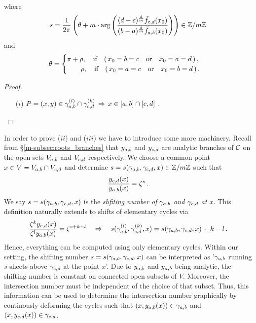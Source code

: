 \documentclass[main.tex]{subfiles}
\begin{document}
\begin{thm}
\begin{itemize}
\begin{align*}
       \end{align*}
       where  
       \begin{align}\label{eq:shift_numb}
       s = \frac{1}{2\pi} \left( \theta +  m \cdot \arg \left( \frac{(d-c)^{\frac{d}{m}} \tilde{f}_{c,d}(x_0)}{(b-a)^{\frac{d}{m}} \tilde{f}_{a,b}(x_0)} \right) \right) \in \mathbb{Z}/m\mathbb{Z}
       \end{align}
       and 
       \begin{align*}
        \theta = \begin{cases}
                              \pi+\rho, \quad \text{if} \quad (\,x_0 = b = c \quad \text{or} \quad x_0 = a = d\,)\,,\\
                              \hspace{0.7cm} \rho, \quad \text{if} \quad (\,x_0 = a = c \quad \text{or} \quad x_0 = b = d\,)\,.
                             \end{cases}
       \end{align*}
      \end{itemize}
 \end{thm}

  \begin{proof}\let\qed\relax
   \begin{itemize}
    \item[($i$)] $P = (x,y) \in \gamma_{a,b}^{(l)} \cap \gamma_{c,d}^{(k)} \,  \Rightarrow \, x \in [a,b] \cap [c,d]$\,.
   \end{itemize}
  \end{proof}
  
  In order to prove ($ii$) and ($iii$) we have to introduce some more machinery. Recall from \S \ref{m-subsec:roots_branches} that $y_{a,b}$ and $y_{c,d}$ are analytic branches of $\mathcal{C}$ on the open sets
  $V_{a,b}$ and $V_{c,d}$ respectively. \abstandl
  We choose a common point $x \in V = V_{a,b} \cap V_{c,d}$ and determine $s  = s(\gamma_{a,b},\gamma_{c,d},x) \in \mathbb{Z}/m\mathbb{Z}$  such that
  \begin{align}
	  \frac{y_{c,d}(x)}{y_{a,b}(x)} = \zeta^s \,.
  \end{align}
  We say $s  = s(\gamma_{a,b},\gamma_{c,d},x)$ is the \emph{shfiting number of $\gamma_{a,b}$ and $\gamma_{c,d}$ at $x$}.
  This definition naturally extends to shifts of elementary cycles via
\begin{align}\label{eq:shift_numb_rel}
	 \frac{\zeta^ky_{c,d}(x)}{\zeta^ly_{a,b}(x)} = \zeta^{s+k-l} \quad \Rightarrow \quad s(\gamma_{a,b}^{(l)},\gamma_{c,d}^{(k)},x) = s(\gamma_{a,b},\gamma_{c,d},x) + k - l\,.
\end{align}
	Hence, everything can be computed using only elementary cycles. \abstandl
	Within our setting, the shifting number $s=s(\gamma_{a,b},\gamma_{c,d},x)$  can be interpreted as '$\gamma_{a,b}$ running $s$ sheets above $\gamma_{c,d}$ at the point $x$'. 
	Due to $y_{a,b}$ and $y_{a,b}$ being analytic, the shifting number is constant on connected open subsets of $V$. Moreover, the intersection number must be independent of the choice of that subset. \abstandl
	Thus,
	this information can be used to determine
	the intersection number graphically by continously deforming the cycles such that $(x,y_{a,b}(x)) \in \gamma_{a,b}$ and $(x,y_{c,d}(x)) \in \gamma_{c,d}$.
	
\end{document}
